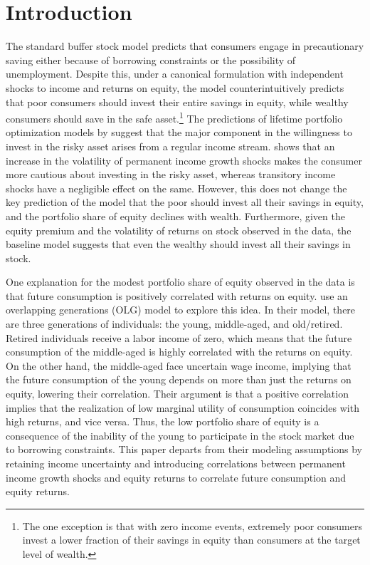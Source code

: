 \section{Introduction}

The standard buffer stock model \citep{Deaton1991, Carroll1997} predicts that consumers engage in precautionary saving either because of borrowing constraints or the possibility of unemployment. Despite this, under a canonical formulation with independent shocks to income and returns on equity, the model counterintuitively predicts that poor consumers should invest their entire savings in equity, while wealthy consumers should save in the safe asset.\footnote{The one exception is that with zero income events, extremely poor consumers invest a lower fraction of their savings in equity than consumers at the target level of wealth.} The predictions of lifetime portfolio optimization models by \citet{Merton1969, Samuelson1969} suggest that the major component in the willingness to invest in the risky asset arises from a regular income stream. \citet{Koo1999} shows that an increase in the volatility of permanent income growth shocks makes the consumer more cautious about investing in the risky asset, whereas transitory income shocks have a negligible effect on the same. However, this does not change the key prediction of the model that the poor should invest all their savings in equity, and the portfolio share of equity declines with wealth. Furthermore, given the equity premium and the volatility of returns on stock observed in the data, the baseline model suggests that even the wealthy should invest all their savings in stock.

One explanation for the modest portfolio share of equity observed in the data is that future consumption is positively correlated with returns on equity. \citet{Constantinides2002} use an overlapping generations (OLG) model to explore this idea. In their model, there are three generations of individuals: the young, middle-aged, and old/retired. Retired individuals receive a labor income of zero, which means that the future consumption of the middle-aged is highly correlated with the returns on equity. On the other hand, the middle-aged face uncertain wage income, implying that the future consumption of the young depends on more than just the returns on equity, lowering their correlation. Their argument is that a positive correlation implies that the realization of low marginal utility of consumption coincides with high returns, and vice versa. Thus, the low portfolio share of equity is a consequence of the inability of the young to participate in the stock market due to borrowing constraints. This paper departs from their modeling assumptions by retaining income uncertainty and introducing correlations between permanent income growth shocks and equity returns to correlate future consumption and equity returns.

